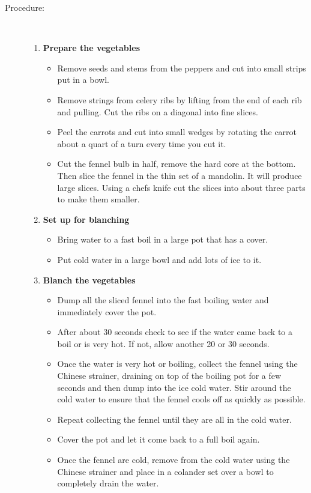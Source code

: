 \documentclass[11pt,letterpaper]{article}
\begin{document}
\begin{description}
\item[Procedure:]\ \\
	\begin{enumerate}
	\item {\bf Prepare the vegetables}
	\begin{itemize}
	\item Remove seeds and stems from the peppers and cut into small strips put in a bowl.
	\item Remove strings from celery ribs by lifting from the end of each rib and pulling. Cut the ribs on a diagonal into fine slices.
	\item Peel the carrots and cut into small wedges by rotating the carrot about a quart of a turn every time you cut it.
	\item Cut the fennel bulb in half, remove the hard core at the bottom. Then slice the fennel in the thin set of a mandolin. It will produce large slices. Using a chefs knife cut the slices into about three parts to make them smaller.
	\end{itemize}
	\item {\bf Set up for blanching}
	\begin{itemize}
	\item Bring water to a fast boil in a large pot that has a cover.
	\item Put cold water in a large bowl and add lots of ice to it.
	\end{itemize}
	\item {\bf Blanch the vegetables}
	\begin{itemize}
	\item Dump all the sliced fennel into the fast boiling water and immediately cover the pot.
	\item After about 30 seconds check to see if the water came back to a boil or is very hot. If not, allow another 20 or 30 seconds.
	\item Once the water is very hot or boiling, collect the fennel using the Chinese strainer, draining on top of the boiling pot for a few seconds and then dump into the ice cold water. Stir around the cold water to ensure that the fennel cools off as quickly as possible.
	\item Repeat collecting the fennel until they are all in the cold water.
	\item Cover the pot and let it come back to a full boil again.
	\item Once the fennel are cold, remove from the cold water using the Chinese strainer and place in a colander set over a bowl to completely drain the water.

\end{itemize}
\end{enumerate}
\end{description}
\end{document}
